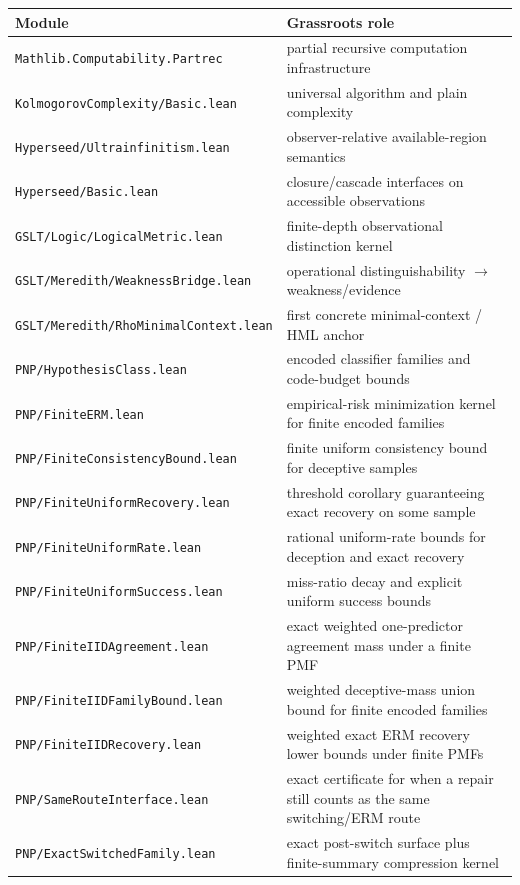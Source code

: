 \documentclass[11pt]{article}
\theoremstyle{remark}
\begin{document}
\begin{center}
\begin{tabular}{ll}
\toprule
\textbf{Module} & \textbf{Grassroots role} \\
\midrule
\texttt{Mathlib.Computability.Partrec} & partial recursive computation infrastructure \\
\texttt{KolmogorovComplexity/Basic.lean} & universal algorithm and plain complexity \\
\texttt{Hyperseed/Ultrainfinitism.lean} & observer-relative available-region semantics \\
\texttt{Hyperseed/Basic.lean} & closure/cascade interfaces on accessible observations \\
\texttt{GSLT/Logic/LogicalMetric.lean} & finite-depth observational distinction kernel \\
\texttt{GSLT/Meredith/WeaknessBridge.lean} & operational distinguishability $\to$ weakness/evidence \\
\texttt{GSLT/Meredith/RhoMinimalContext.lean} & first concrete minimal-context / HML anchor \\
\texttt{PNP/HypothesisClass.lean} & encoded classifier families and code-budget bounds \\
\texttt{PNP/FiniteERM.lean} & empirical-risk minimization kernel for finite encoded families \\
\texttt{PNP/FiniteConsistencyBound.lean} & finite uniform consistency bound for deceptive samples \\
\texttt{PNP/FiniteUniformRecovery.lean} & threshold corollary guaranteeing exact recovery on some sample \\
\texttt{PNP/FiniteUniformRate.lean} & rational uniform-rate bounds for deception and exact recovery \\
\texttt{PNP/FiniteUniformSuccess.lean} & miss-ratio decay and explicit uniform success bounds \\
\texttt{PNP/FiniteIIDAgreement.lean} & exact weighted one-predictor agreement mass under a finite PMF \\
\texttt{PNP/FiniteIIDFamilyBound.lean} & weighted deceptive-mass union bound for finite encoded families \\
\texttt{PNP/FiniteIIDRecovery.lean} & weighted exact ERM recovery lower bounds under finite PMFs \\
\texttt{PNP/SameRouteInterface.lean} & exact certificate for when a repair still counts as the same switching/ERM route \\
\texttt{PNP/ExactSwitchedFamily.lean} & exact post-switch surface plus finite-summary compression kernel \\

\end{tabular}
\end{center}
\end{document}
